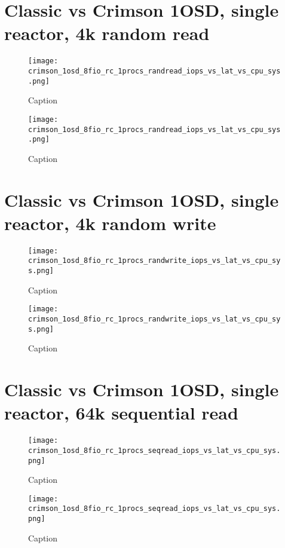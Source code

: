 \documentclass[]{report}
\begin{document}


\chapter{Classic vs Crimson 1OSD, single reactor, 4k random read}
\begin{figure}[ht]
  \centering
  \texttt{[image: crimson\_1osd\_8fio\_rc\_1procs\_randread\_iops\_vs\_lat\_vs\_cpu\_sys.png]}
\caption{Caption}
\end{figure}

\begin{figure}[h]
  \centering
  \texttt{[image: crimson\_1osd\_8fio\_rc\_1procs\_randread\_iops\_vs\_lat\_vs\_cpu\_sys.png]}
\caption{Caption}
\end{figure}

%    
\chapter{Classic vs Crimson 1OSD, single reactor, 4k random write}
\begin{figure}[ht]
  \centering
  \texttt{[image: crimson\_1osd\_8fio\_rc\_1procs\_randwrite\_iops\_vs\_lat\_vs\_cpu\_sys.png]}
\caption{Caption}
\end{figure}

\begin{figure}[h]
  \centering
  \texttt{[image: crimson\_1osd\_8fio\_rc\_1procs\_randwrite\_iops\_vs\_lat\_vs\_cpu\_sys.png]}
\caption{Caption}
\end{figure}

\chapter{Classic vs Crimson 1OSD, single reactor, 64k sequential read}
\begin{figure}[ht]
  \centering
  \texttt{[image: crimson\_1osd\_8fio\_rc\_1procs\_seqread\_iops\_vs\_lat\_vs\_cpu\_sys.png]}
\caption{Caption}
\end{figure}

\begin{figure}[h]
  \centering
  \texttt{[image: crimson\_1osd\_8fio\_rc\_1procs\_seqread\_iops\_vs\_lat\_vs\_cpu\_sys.png]}
\caption{Caption}
\end{figure}
\end{document}
